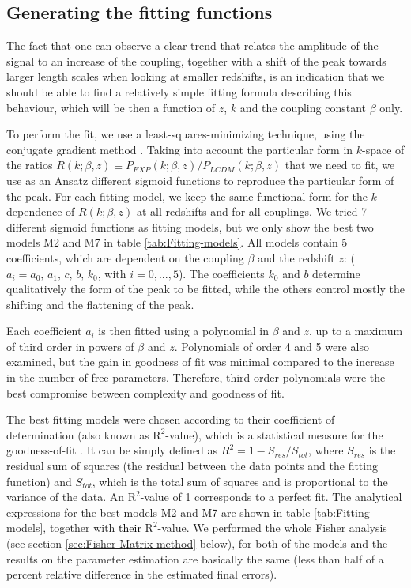 \subsection{Generating the fitting functions}

The fact that one can observe a clear trend that relates the amplitude
of the signal to an increase of the coupling, together with a shift
of the peak towards larger length scales when looking at smaller redshifts,
is an indication that we should be able to find a relatively simple
fitting formula describing this behaviour, which will be then a function
of $z$, $k$ and the coupling constant $\beta$ only.

To perform the fit, we use a least-squares-minimizing technique, using
the conjugate gradient method \cite{weisstein_least_????}. Taking
into account the particular form in $k$-space of the ratios $R(k;\beta,z)\equiv P_{EXP}(k;\beta,z)/P_{LCDM}(k;\beta,z)$
that we need to fit, we use as an Ansatz different sigmoid functions
to reproduce the particular form of the peak. For each fitting model,
we keep the same functional form for the $k$-dependence of $R(k;\beta,z)$
at all redshifts and for all couplings. We tried 7 different sigmoid
functions as fitting models, but we only show the best two models
M2 and M7 in table \ref{tab:Fitting-models}. All models contain 5
coefficients, which are dependent on the coupling $\beta$ and the
redshift $z$: ($a_{i}=a_{0},\, a_{1},\, c,\, b,\, k_{0}$, with $i=0,...,5$).
The coefficients $k_{0}$ and $b$ determine qualitatively the form
of the peak to be fitted, while the others control mostly the shifting
and the flattening of the peak.

Each coefficient $a_{i}$ is then fitted using a polynomial in $\beta$
and $z$, up to a maximum of third order in powers of $\beta$ and
$z$. Polynomials of order 4 and 5 were also examined, but the gain
in goodness of fit was minimal compared to the increase in the number
of free parameters. Therefore, third order polynomials were the best
compromise between complexity and goodness of fit.

The best fitting models were chosen according to their coefficient
of determination (also known as $\mbox{R}^{2}$-value), which is a
statistical measure for the goodness-of-fit \textcolor{green}{\cite{weisstein_correlation_????}}.
It can be simply defined as $R^{2}=1-S_{res}/S_{tot}$, where $S_{res}$
is the residual sum of squares (the residual between the data points
and the fitting function) and $S_{tot}$, which is the total sum of
squares and is proportional to the variance of the data. An $\mbox{R}^{2}$-value
of 1 corresponds to a perfect fit. The analytical expressions for
the best models M2 and M7 are shown in table \ref{tab:Fitting-models},
together with \textcolor{black}{their} $\mbox{R}^{2}$-value. We performed
the whole Fisher analysis (see section \ref{sec:Fisher-Matrix-method}
below), for both of the models and the results on the parameter estimation
are basically the same (less than half of a percent relative difference
in the estimated final errors).

